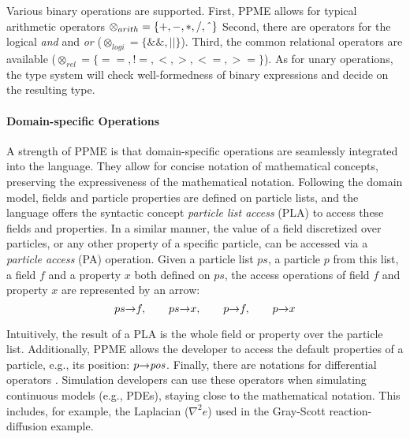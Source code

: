    Various binary operations are supported. First, PPME allows for typical arithmetic
    operators
      $\otimes_{arith} = \{ +, -, *, /, \text{\^{}} \}$
    Second, there are operators for the logical \emph{and} and \emph{or}
      ($\otimes_{logi} = \{ \&\&, || \} $).
    Third, the common relational operators are available
      ($\otimes_{rel} = \{ ==, !\!\!=, <, >, <=, >= \}$).
    As for unary operations, the type system will check well-formedness of binary
    expressions and decide on the resulting type.

  \paragraph{Domain-specific Operations}
  \label{par:domain_specific_operations}

    A strength of PPME is that domain-specific operations are seamlessly
    integrated into the language. They allow for concise notation of mathematical
    concepts, preserving the expressiveness of the mathematical notation. Following the
    domain model, fields and particle properties are defined on particle lists, and the language
    offers the syntactic concept \emph{particle list access} (PLA) to access these fields
    and properties. In a similar manner, the value of a field discretized over particles,
    or any other property of a specific particle, can be accessed via a \emph{particle access} (PA) operation.
    Given a particle list $ps$, a particle $p$ from this list, a field $f$ and a
    property $x$ both defined on $ps$, the access operations of field $f$ and property
    $x$ are represented by an arrow:%
%
    \[ ps{\to}f, \qquad ps{\to}x, \qquad p{\to}f, \qquad p{\to}x \]

    Intuitively, the result of a PLA is the whole field or property over the particle
    list. Additionally, PPME allows the developer to access the default properties of a
    particle, e.g., its position: $p{\to}\mathit{pos}$.
    Finally, there are notations for differential operators . Simulation developers can use these
    operators when simulating continuous models (e.g., PDEs), staying close to
    the mathematical notation. This includes, for example, the Laplacian
    ($\nabla^2 e$) used in the Gray-Scott reaction-diffusion example.

